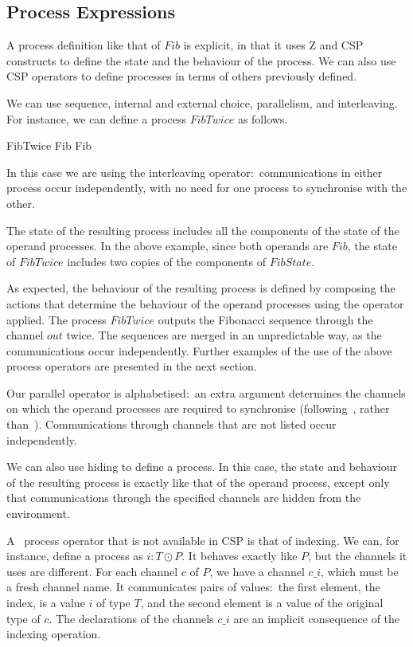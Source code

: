 \documentclass{article}
\begin{document}
\subsection{Process Expressions}

A process definition like that of $Fib$ is explicit, in that it uses Z
and CSP constructs to define the state and the behaviour of the
process.  We can also use CSP operators to define processes in terms
of others previously defined.

We can use sequence, internal and external choice, parallelism, and
interleaving.  For instance, we can define a process $FibTwice$ as
follows.
\begin{zed}
  FibTwice  Fib \interleave Fib
\end{zed}
In this case we are using the interleaving operator:~communications in
either process occur independently, with no need for one process to
synchronise with the other.

The state of the resulting process includes all the components of the
state of the operand processes.  In the above example, since both
operands are $Fib$, the state of $FibTwice$ includes two copies of the
components of $FibState$.

As expected, the behaviour of the resulting process is defined by
composing the actions that determine the behaviour of the operand
processes using the operator applied.  The process $FibTwice$ outputs
the Fibonacci sequence through the channel $out$ twice.  The sequences
are merged in an unpredictable way, as the communications occur
independently.  Further examples of the use of the above process
operators are presented in the next section.

Our parallel operator is alphabetised:~an extra argument determines
the channels on which the operand processes are required to
synchronise (following~\cite{Ros98}, rather than~\cite{Hoa85}).
Communications through channels that are not listed occur
independently.

We can also use hiding to define a process.  In this case, the state
and behaviour of the resulting process is exactly like that of the
operand process, except only that communications through the specified
channels are hidden from the environment.

A \Circus\ process operator that is not available in CSP is that of
indexing.  We can, for instance, define a process as $i: T \odot P $.
It behaves exactly like $P$, but the channels it uses are different.
For each channel $c$ of $P$, we have a channel $c\_i$, which must be a
fresh channel name.  It communicates pairs of values:~the first
element, the index, is a value $i$ of type $T$, and the second element
is a value of the original type of $c$.  The declarations of the
channels $c\_i$ are an implicit consequence of the indexing operation.
\end{document}
